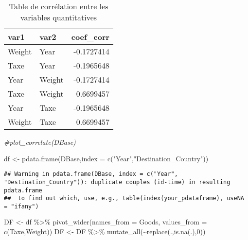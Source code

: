 \documentclass[
]{book}
\newenvironment{Shaded}{\begin{snugshade}}{\end{snugshade}}
\newcommand{\AttributeTok}[1]{\textcolor[rgb]{0.77,0.63,0.00}{#1}}
\newcommand{\CommentTok}[1]{\textcolor[rgb]{0.56,0.35,0.01}{\textit{#1}}}
\newcommand{\DecValTok}[1]{\textcolor[rgb]{0.00,0.00,0.81}{#1}}
\newcommand{\FunctionTok}[1]{\textcolor[rgb]{0.00,0.00,0.00}{#1}}
\newcommand{\NormalTok}[1]{#1}
\newcommand{\OtherTok}[1]{\textcolor[rgb]{0.56,0.35,0.01}{#1}}
\newcommand{\SpecialCharTok}[1]{\textcolor[rgb]{0.00,0.00,0.00}{#1}}
\newcommand{\StringTok}[1]{\textcolor[rgb]{0.31,0.60,0.02}{#1}}
\begin{document}
\begin{table}

\caption{\label{tab:unnamed-chunk-41}Table de corrélation entre les variables quantitatives}
\centering
\begin{tabular}[t]{l|l|r}
\hline
var1 & var2 & coef\_corr\\
\hline
Weight & Year & -0.1727414\\
\hline
Taxe & Year & -0.1965648\\
\hline
Year & Weight & -0.1727414\\
\hline
Taxe & Weight & 0.6699457\\
\hline
Year & Taxe & -0.1965648\\
\hline
Weight & Taxe & 0.6699457\\
\hline
\end{tabular}
\end{table}

\begin{Shaded}
\begin{Highlighting}[]
\CommentTok{\#plot\_correlate(DBase)}
\end{Highlighting}
\end{Shaded}

\begin{Shaded}
\begin{Highlighting}[]
\NormalTok{df }\OtherTok{\textless{}{-}} \FunctionTok{pdata.frame}\NormalTok{(DBase,}\AttributeTok{index =} \FunctionTok{c}\NormalTok{(}\StringTok{"Year"}\NormalTok{,}\StringTok{"Destination\_Country"}\NormalTok{))}
\end{Highlighting}
\end{Shaded}

\begin{verbatim}
## Warning in pdata.frame(DBase, index = c("Year", "Destination_Country")): duplicate couples (id-time) in resulting pdata.frame
##  to find out which, use, e.g., table(index(your_pdataframe), useNA = "ifany")
\end{verbatim}

\begin{Shaded}
\begin{Highlighting}[]
\NormalTok{DF }\OtherTok{\textless{}{-}}\NormalTok{ df }\SpecialCharTok{\%\textgreater{}\%} \FunctionTok{pivot\_wider}\NormalTok{(}\AttributeTok{names\_from =}\NormalTok{ Goods, }\AttributeTok{values\_from =} \FunctionTok{c}\NormalTok{(Taxe,Weight))}
\NormalTok{DF }\OtherTok{\textless{}{-}}\NormalTok{ DF }\SpecialCharTok{\%\textgreater{}\%} \FunctionTok{mutate\_all}\NormalTok{(}\SpecialCharTok{\textasciitilde{}}\FunctionTok{replace}\NormalTok{(.,}\FunctionTok{is.na}\NormalTok{(.),}\DecValTok{0}\NormalTok{))}
\end{Highlighting}
\end{Shaded}
\end{document}
